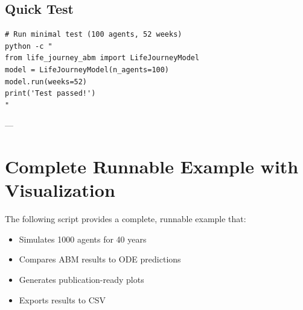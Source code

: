\subsection{Quick Test}

\begin{verbatim}
# Run minimal test (100 agents, 52 weeks)
python -c "
from life_journey_abm import LifeJourneyModel
model = LifeJourneyModel(n_agents=100)
model.run(weeks=52)
print('Test passed!')
"
\end{verbatim}

---


\section{Complete Runnable Example with Visualization}
\label{ppp:example}

\begin{tcolorbox}[colback=gray!5!white, colframe=gray!75!black, title=Production Example Script]
The following script provides a complete, runnable example that:
\begin{itemize}[nosep]
\item Simulates 1000 agents for 40 years
\item Compares ABM results to ODE predictions
\item Generates publication-ready plots
\item Exports results to CSV
\end{itemize}
\end{tcolorbox}

